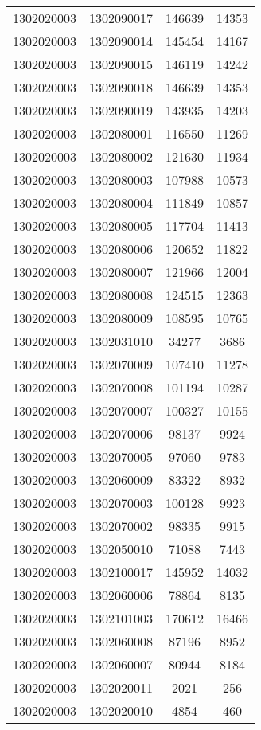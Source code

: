 \begin{longtable}[h]{llcc}
		1302020003 & 1302090017 & 146639 & 14353\\
		1302020003 & 1302090014 & 145454 & 14167\\
		1302020003 & 1302090015 & 146119 & 14242\\
		1302020003 & 1302090018 & 146639 & 14353\\
		1302020003 & 1302090019 & 143935 & 14203\\
		1302020003 & 1302080001 & 116550 & 11269\\
		1302020003 & 1302080002 & 121630 & 11934\\
		1302020003 & 1302080003 & 107988 & 10573\\
		1302020003 & 1302080004 & 111849 & 10857\\
		1302020003 & 1302080005 & 117704 & 11413\\
		1302020003 & 1302080006 & 120652 & 11822\\
		1302020003 & 1302080007 & 121966 & 12004\\
		1302020003 & 1302080008 & 124515 & 12363\\
		1302020003 & 1302080009 & 108595 & 10765\\
		1302020003 & 1302031010 & 34277 & 3686\\
		1302020003 & 1302070009 & 107410 & 11278\\
		1302020003 & 1302070008 & 101194 & 10287\\
		1302020003 & 1302070007 & 100327 & 10155\\
		1302020003 & 1302070006 & 98137 & 9924\\
		1302020003 & 1302070005 & 97060 & 9783\\
		1302020003 & 1302060009 & 83322 & 8932\\
		1302020003 & 1302070003 & 100128 & 9923\\
		1302020003 & 1302070002 & 98335 & 9915\\
		1302020003 & 1302050010 & 71088 & 7443\\
		1302020003 & 1302100017 & 145952 & 14032\\
		1302020003 & 1302060006 & 78864 & 8135\\
		1302020003 & 1302101003 & 170612 & 16466\\
		1302020003 & 1302060008 & 87196 & 8952\\
		1302020003 & 1302060007 & 80944 & 8184\\
		1302020003 & 1302020011 & 2021 & 256\\
		1302020003 & 1302020010 & 4854 & 460\\

\end{longtable}
